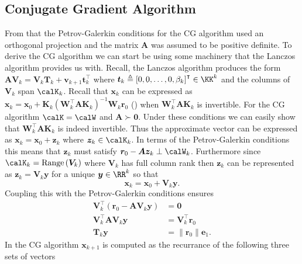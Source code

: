 \subsection{Conjugate Gradient Algorithm}\label{Section4.5}

From  that the Petrov-Galerkin conditions for the CG algorithm used an orthogonal projection and the matrix $\bm{A}$ was assumed to be positive definite. To derive the CG algorithm we can start be using some machinery that the Lanczos algorithm provides us with. Recall, the Lanczos algorithm produces the form $\bm{A}\bm{V}_{k} = \bm{V}_{k} \bm{T}_k + \bm{v}_{k+1} \bm{t}_{k}^{\intercal}$ where $\bm{t}_{k} \triangleq \left[ 0,0, \ldots , 0, \beta_k \right]^{\intercal} \in \KK^k$ and the columns of $\bm{V}_{k}$ span $\calK_k$. Recall that $\bm{x}_k$ can be expressed as $\bm{x}_k = \bm{x}_0 + \bm{K}_k \left( \bm{W}_k^{\intercal} \bm{A} \bm{K}_k \right)^{-1} \bm{W}_k \bm{r}_0$ () when $\bm{W}_k^{\intercal} \bm{A} \bm{K}_k$ is invertible. For the CG algorithm $\calK = \calW$ and $\bm{A} \succ \bm{0}$. Under these conditions we can easily show that $\bm{W}_k^{\intercal} \bm{A} \bm{K}_k$ is indeed invertible. Thus the approximate vector can be expressed as $\bm{x}_k = \bm{x}_0 + \bm{z}_k$ where $\bm{z}_k \in \calK_k$. In terms of the Petrov-Galerkin conditions this means that $\bm{z}_k$ must satisfy $\bm{r}_0 - \bm{A} \bm{z}_k \perp \calW_k$. Furthermore since $\calK_k = \operatorname{Range} \left( \bm{V}_{k} \right)$ where $\bm{V}_{k}$ has full column rank then $\bm{z}_k$ can be represented as $\bm{z}_k = \bm{V}_{k} \bm{y}$ for a unique $\bm{y} \in \RR^k$ so that
\begin{equation} \label{eq: x_eq_Qky}
    \bm{x}_k = \bm{x}_0 + \bm{V}_{k} \bm{y}.
\end{equation}
Coupling this with the Petrov-Galerkin conditions ensures
\begin{align} \label{eq: Tky_eq_normr0e1}
    \bm{V}_{k}^{\intercal} \left( \bm{r}_0 - \bm{A} \bm{V}_{k} \bm{y} \right) & = \bm{0}                        \nonumber   \\
    \bm{V}_{k}^{\intercal} \bm{A} \bm{V}_{k} \bm{y}                           & = \bm{V}_{k}^{\intercal} \bm{r}_0 \nonumber \\
    \bm{T}_k \bm{y}                                                           & = \| \bm{r}_0 \| \bm{e}_1.
\end{align}
In the CG algorithm $\bm{x}_{k+1}$ is computed as the recurrance of the following three sets of vectors
